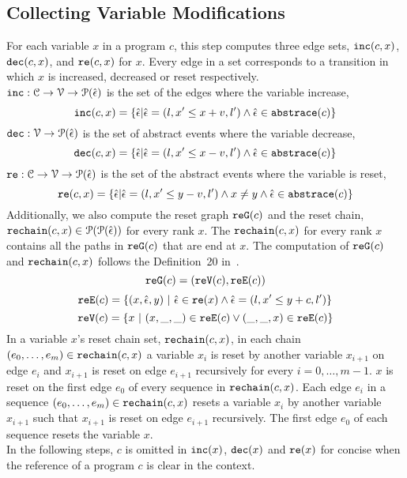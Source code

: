   \subsection{Collecting Variable Modifications}
  For each variable $x$ in a program $c$, this step computes three edge sets, $\mathtt{inc}(c, x)$, $\mathtt{dec}(c, x)$,
  and $\mathtt{re}(c, x)$ for $x$.
  Every edge in a set corresponds to a transition in which $x$ is increased,
  decreased
  or reset
  respectively.
  \\
  $\mathtt{inc}: \mathcal{C} \to \mathcal{V} \to \mathcal{P}(\hat{\mathtt{\epsilon}{}}) $
  is the set of the edges where the variable increase, 
  \[ \inc(c, x) = \left\{ \absevent | \absevent = (l, x' \leq x + v, l') \land \absevent \in \absflow(c) \right\} \]
  $\mathtt{dec}: \mathcal{V} \to \mathcal{P}(\hat{\mathtt{\epsilon}{}}) $
  is the set of abstract events where the variable decrease,
  \[\dec(c, x) = \left\{\absevent| \absevent = (l,  x' \leq x - v, l') \land \absevent \in \absflow(c) \right\}\]
  $\mathtt{re}: \mathcal{C} \to \mathcal{V} \to \mathcal{P}(\hat{\mathtt{\epsilon}{}}) $ is the set of the abstract events where the variable is reset,
%
  \[\reset(c, x) = \left\{ \absevent| \absevent = (l,  x' \leq y - v, l') \land x \neq y \land \absevent \in \absflow(c) \right\}\]
  Additionally,
  we also compute the reset graph $\mathtt{re{G}}(c)$ and the reset chain, $\mathtt{rechain}(c, x) \in \mathcal{P}(\mathcal{P}(\hat{\mathtt{\epsilon}{}}))$ for every rank $x$.
  The $\mathtt{rechain}(c, x)$ for every rank $x$ contains all the paths in $\mathtt{re{G}}(c)$ that are end at $x$.
  The computation of $\mathtt{re{G}}(c)$ and $\mathtt{rechain}(c, x)$ follows the Definition~20 in~\cite{sinn2017complexity}.
  \[\mathtt{re{G}}(c) = (\mathtt{re{V}}(c), \mathtt{re{E}}(c))\]
  \[\resetE(c) = \left\{ (x, \absevent, y) ~\vert~ \absevent \in \reset(x) \land \absevent = (l, x' \leq y + c, l') \right\} \]
  \[\resetV(c) = \left\{ x ~\vert~ (x, \_, \_) \in \resetE(c) \lor (\_, \_, x) \in \resetE(c) \right\} \]
  In a variable $x$'s reset chain set, $\mathtt{rechain}(c, x)$, in each chain $(e_0, \ldots, e_m) \in \mathtt{rechain}(c, x)$
  a variable $x_i$ is reset by another variable $x_{i + 1}$ on edge $e_{i}$
  and $x_{i + 1}$ is reset on edge $e_{i + 1}$ recursively
  for every $i = 0, \ldots, m - 1$.
  $x$ is reset on the first edge $e_0$ of every sequence in $\mathtt{rechain}(c, x)$.
  {Each edge $e_i$ in a sequence $(e_0, \ldots, e_m) \in \mathtt{rechain}(c, x)$
  resets a variable $x_i$ by another variable $x_{i + 1}$ such that $x_{i + 1}$
  is reset on edge $e_{i + 1}$ recursively. The first edge $e_0$ of each sequence resets the variable $x$.}
  \\
  In the following steps, $c$ is omitted in $\mathtt{inc}(x)$,
  $\mathtt{dec}(x)$ and $\mathtt{re}(x)$ for concise when the reference of a program $c$ is clear in the context.

